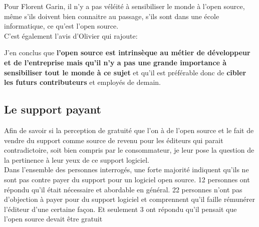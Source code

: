 				Pour Florent Garin, il n'y a pas véléité à sensibiliser le monde à l'open source, même s'ils doivent bien connaitre au passage, s'ils sont dans une école informatique, ce qu'est l'open source.\\

				C'est également l'avis d'Olivier  qui rajoute:

				\begin{center}
					\textit{
					}
				\end{center}

				J'en conclus que \textbf{l'open source est intrinsèque au métier de développeur et de l'entreprise mais qu'il n'y a pas une grande importance à sensibiliser tout le monde à ce sujet} et qu'il est préférable donc de \textbf{cibler les futurs contributeurs} et employés de demain.\\

				\newpage

		\subsection{Le support payant}

			Afin de savoir si la perception de gratuité que l'on à de l'open source et le fait de vendre du support comme source de revenu pour les éditeurs qui parait contradictoire, soit bien compris par le consommateur, je leur pose la question de la pertinence à leur yeux de ce support logiciel.\\

			Dans l'ensemble des personnes interrogés, une forte majorité indiquent qu'ils ne sont pas contre payer du support pour un logiciel open source. 12 personnes ont répondu qu'il était nécessaire et abordable en général. 22 personnes n'ont pas d'objection à payer pour du support logiciel et comprennent qu'il faille rémunérer l'éditeur d'une certaine façon. Et seulement 3 ont répondu qu'il pensait que l'open source devait être gratuit


